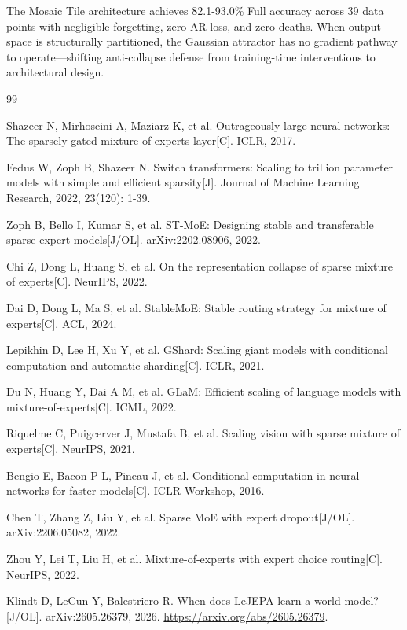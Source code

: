 \documentclass[twoside]{article}
\theoremstyle{definition}
\begin{document}
The Mosaic Tile architecture achieves 82.1-93.0\% Full accuracy across 39 data points with negligible forgetting, zero AR loss, and zero deaths. When output space is structurally partitioned, the Gaussian attractor has no gradient pathway to operate---shifting anti-collapse defense from training-time interventions to architectural design.

\begin{thebibliography}{99}

 Shazeer N, Mirhoseini A, Maziarz K, et al. Outrageously large neural networks: The sparsely-gated mixture-of-experts layer[C]. ICLR, 2017.

 Fedus W, Zoph B, Shazeer N. Switch transformers: Scaling to trillion parameter models with simple and efficient sparsity[J]. Journal of Machine Learning Research, 2022, 23(120): 1-39.

 Zoph B, Bello I, Kumar S, et al. ST-MoE: Designing stable and transferable sparse expert models[J/OL]. arXiv:2202.08906, 2022.

 Chi Z, Dong L, Huang S, et al. On the representation collapse of sparse mixture of experts[C]. NeurIPS, 2022.

 Dai D, Dong L, Ma S, et al. StableMoE: Stable routing strategy for mixture of experts[C]. ACL, 2024.

 Lepikhin D, Lee H, Xu Y, et al. GShard: Scaling giant models with conditional computation and automatic sharding[C]. ICLR, 2021.

 Du N, Huang Y, Dai A M, et al. GLaM: Efficient scaling of language models with mixture-of-experts[C]. ICML, 2022.

 Riquelme C, Puigcerver J, Mustafa B, et al. Scaling vision with sparse mixture of experts[C]. NeurIPS, 2021.

 Bengio E, Bacon P L, Pineau J, et al. Conditional computation in neural networks for faster models[C]. ICLR Workshop, 2016.

 Chen T, Zhang Z, Liu Y, et al. Sparse MoE with expert dropout[J/OL]. arXiv:2206.05082, 2022.

 Zhou Y, Lei T, Liu H, et al. Mixture-of-experts with expert choice routing[C]. NeurIPS, 2022.

 Klindt D, LeCun Y, Balestriero R. When does LeJEPA learn a world model?[J/OL]. arXiv:2605.26379, 2026. \url{https://arxiv.org/abs/2605.26379}.


\end{thebibliography}
\end{document}
